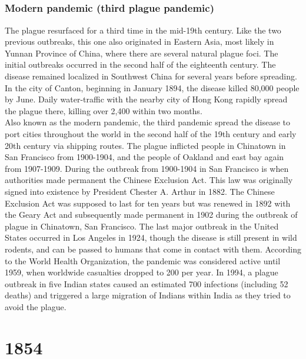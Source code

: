 \documentclass[11pt]{report}
\begin{document}
\section{}
\subsection{Modern pandemic (third plague pandemic)}
The plague resurfaced for a third time in the mid-19th century. Like the two previous outbreaks, this one also originated in Eastern Asia, most likely in Yunnan Province of China, where there are several natural plague foci. The initial outbreaks occurred in the second half of the eighteenth century. The disease remained localized in Southwest China for several years before spreading. In the city of Canton, beginning in January 1894, the disease killed 80,000 people by June. Daily water-traffic with the nearby city of Hong Kong rapidly spread the plague there, killing over 2,400 within two months.\\
Also known as the modern pandemic, the third pandemic spread the disease to port cities throughout the world in the second half of the 19th century and early 20th century via shipping routes. The plague inflicted people in Chinatown in San Francisco from 1900-1904, and the people of Oakland and east bay again from 1907-1909. During the outbreak from 1900-1904 in San Francisco is when authorities made permanent the Chinese Exclusion Act. This law was originally signed into existence by President Chester A. Arthur in 1882. The Chinese Exclusion Act was supposed to last for ten years but was renewed in 1892 with the Geary Act and subsequently made permanent in 1902 during the outbreak of plague in Chinatown, San Francisco. The last major outbreak in the United States occurred in Los Angeles in 1924, though the disease is still present in wild rodents, and can be passed to humans that come in contact with them. According to the World Health Organization, the pandemic was considered active until 1959, when worldwide casualties dropped to 200 per year. In 1994, a plague outbreak in five Indian states caused an estimated 700 infections (including 52 deaths) and triggered a large migration of Indians within India as they tried to avoid the plague.

\chapter{1854}
\end{document}
